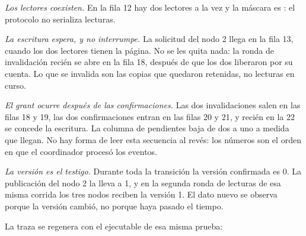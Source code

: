 \emph{Los lectores coexisten.} En la fila 12 hay dos lectores a la vez y la
máscara es : el protocolo no serializa lecturas.

\emph{La escritura espera, y no interrumpe.} La solicitud del nodo 2 llega en
la fila 13, cuando los dos lectores tienen la página. No se les quita nada: la
ronda de invalidación recién se abre en la fila 18, después de que los dos
liberaron por su cuenta. Lo que se invalida son las copias que quedaron
retenidas, no lecturas en curso.

\emph{El grant ocurre después de las confirmaciones.} Las dos invalidaciones
salen en las filas 18 y 19, las dos confirmaciones entran en las filas 20 y
21, y recién en la 22 se concede la escritura. La columna de pendientes baja
de dos a uno a medida que llegan. No hay forma de leer esta secuencia al
revés: los números son el orden en que el coordinador procesó los eventos.

\emph{La versión es el testigo.} Durante toda la transición la versión
confirmada es 0. La publicación del nodo 2 la lleva a 1, y en la segunda ronda
de lecturas de esa misma corrida los tres nodos reciben la versión 1. El dato
nuevo se observa porque la versión cambió, no porque haya pasado el tiempo.

La traza se regenera con el ejecutable de esa misma prueba:

\begin{center}
\end{center}
